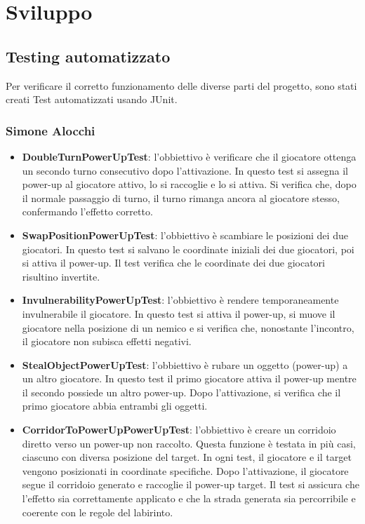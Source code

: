 \documentclass[a4paper,12pt]{report}
\begin{document}
\chapter{Sviluppo}
\section{Testing automatizzato}

Per verificare il corretto funzionamento delle diverse parti del progetto, sono
 stati creati Test automatizzati usando JUnit.

\subsection{Simone Alocchi}
\begin{itemize}
	\item \textbf{DoubleTurnPowerUpTest}: 
	l'obbiettivo è verificare che il giocatore ottenga un secondo turno consecutivo dopo l’attivazione.  
	In questo test si assegna il power-up al giocatore attivo, lo si raccoglie e lo si attiva.  
	Si verifica che, dopo il normale passaggio di turno, il turno rimanga ancora al giocatore stesso, confermando l’effetto corretto.
	\item \textbf{SwapPositionPowerUpTest}: 
	l'obbiettivo è scambiare le posizioni dei due giocatori.  
	In questo test si salvano le coordinate iniziali dei due giocatori, poi si attiva il power-up.  
	Il test verifica che le coordinate dei due giocatori risultino invertite.
	\item \textbf{InvulnerabilityPowerUpTest}:
	l'obbiettivo è rendere temporaneamente invulnerabile il giocatore.  
	In questo test si attiva il power-up, si muove il giocatore nella posizione di un nemico e si verifica che, 
	nonostante l’incontro, il giocatore non subisca effetti negativi.
	\item \textbf{StealObjectPowerUpTest}: 
	l'obbiettivo è rubare un oggetto (power-up) a un altro giocatore.  
	In questo test il primo giocatore attiva il power-up mentre il secondo possiede un altro power-up.  
	Dopo l’attivazione, si verifica che il primo giocatore abbia entrambi gli oggetti.
	\item \textbf{CorridorToPowerUpPowerUpTest}: 
	l'obbiettivo è creare un corridoio diretto verso un power-up non raccolto.  
	Questa funzione è testata in più casi, ciascuno con diversa posizione del target.
	In ogni test, il giocatore e il target vengono posizionati in coordinate specifiche.  
	Dopo l’attivazione, il giocatore segue il corridoio generato e raccoglie il power-up target.  
	Il test si assicura che l’effetto sia correttamente applicato e che la strada generata sia percorribile e coerente con le regole del labirinto.
\end{itemize}
\end{document}
